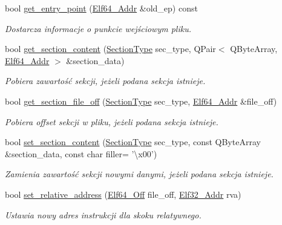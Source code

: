 \begin{DoxyCompactItemize}
bool \hyperlink{class_e_l_f_adf71ac4ae5cfedb1b1415b2f5da2494f}{get\-\_\-entry\-\_\-point} (\hyperlink{elf_8h_aeed51d08e3a950d637f8ec1f0cd4ef65}{Elf64\-\_\-\-Addr} \&old\-\_\-ep) const 
\begin{DoxyCompactList}\small\item\em Dostarcza informacje o punkcie wejściowym pliku. \end{DoxyCompactList}\item 
bool \hyperlink{class_e_l_f_aaa7edcb97e8cd8b0ca759d7df7984b12}{get\-\_\-section\-\_\-content} (\hyperlink{class_e_l_f_abaebdfb7048441e430684d68df8d73d1}{Section\-Type} sec\-\_\-type, Q\-Pair$<$ Q\-Byte\-Array, \hyperlink{elf_8h_aeed51d08e3a950d637f8ec1f0cd4ef65}{Elf64\-\_\-\-Addr} $>$ \&section\-\_\-data)
\begin{DoxyCompactList}\small\item\em Pobiera zawartość sekcji, jeżeli podana sekcja istnieje. \end{DoxyCompactList}\item 
bool \hyperlink{class_e_l_f_af326c6489cd6953ae4d21ba194c76d41}{get\-\_\-section\-\_\-file\-\_\-off} (\hyperlink{class_e_l_f_abaebdfb7048441e430684d68df8d73d1}{Section\-Type} sec\-\_\-type, \hyperlink{elf_8h_aeed51d08e3a950d637f8ec1f0cd4ef65}{Elf64\-\_\-\-Addr} \&file\-\_\-off)
\begin{DoxyCompactList}\small\item\em Pobiera offset sekcji w pliku, jeżeli podana sekcja istnieje. \end{DoxyCompactList}\item 
bool \hyperlink{class_e_l_f_aede545aa3f960b681a4a7b9be8f67833}{set\-\_\-section\-\_\-content} (\hyperlink{class_e_l_f_abaebdfb7048441e430684d68df8d73d1}{Section\-Type} sec\-\_\-type, const Q\-Byte\-Array \&section\-\_\-data, const char filler= '\textbackslash{}x00')
\begin{DoxyCompactList}\small\item\em Zamienia zawartość sekcji nowymi danymi, jeżeli podana sekcja istnieje. \end{DoxyCompactList}\item 
bool \hyperlink{class_e_l_f_a6844855ce268b49bb39b75e117bad008}{set\-\_\-relative\-\_\-address} (\hyperlink{elf_8h_a6f7837bc80df7a68291fce54ff088849}{Elf64\-\_\-\-Off} file\-\_\-off, \hyperlink{elf_8h_a40c6d4571e6001f443cc6a6474620158}{Elf32\-\_\-\-Addr} rva)
\begin{DoxyCompactList}\small\item\em Ustawia nowy adres instrukcji dla skoku relatywnego. \end{DoxyCompactList}\item 

\end{DoxyCompactItemize}
